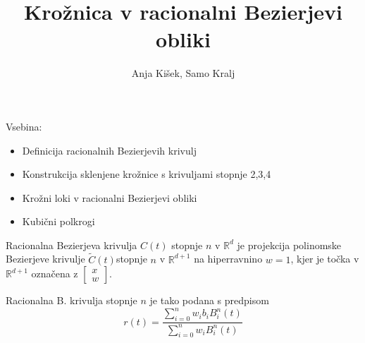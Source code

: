 \documentclass[t]{beamer}
\title{Krožnica v racionalni Bezierjevi obliki}
\author{Anja Kišek, Samo Kralj}
\begin{document}
\begin{frame}
\titlepage
\end{frame}


\begin{frame}
Vsebina:
\begin{itemize}
\item Definicija racionalnih Bezierjevih krivulj

\item Konstrukcija sklenjene krožnice s krivuljami stopnje 2,3,4

\item Krožni loki v racionalni Bezierjevi obliki

\item Kubični polkrogi

\end{itemize}

\end{frame}
\begin{frame}
Racionalna Bezierjeva krivulja $C(t)$ stopnje $n$ v $\mathbb{R}^d$ je projekcija polinomske Bezierjeve krivulje $\tilde{C}(t)$stopnje $n$ v $\mathbb{R}^{d+1}$ na hiperravnino $w=1$, kjer je točka v $\mathbb{R}^{d+1}$ označena z $
\begin{bmatrix} x \\ w \end{bmatrix}.$


Racionalna B. krivulja stopnje $n$ je tako podana s predpisom
$$r(t) = \frac{\sum_{i=0}^n w_ib_iB_i^n(t)}{\sum_{i=0}^n w_iB_i^n(t)} $$

\end{frame}
\end{document}
